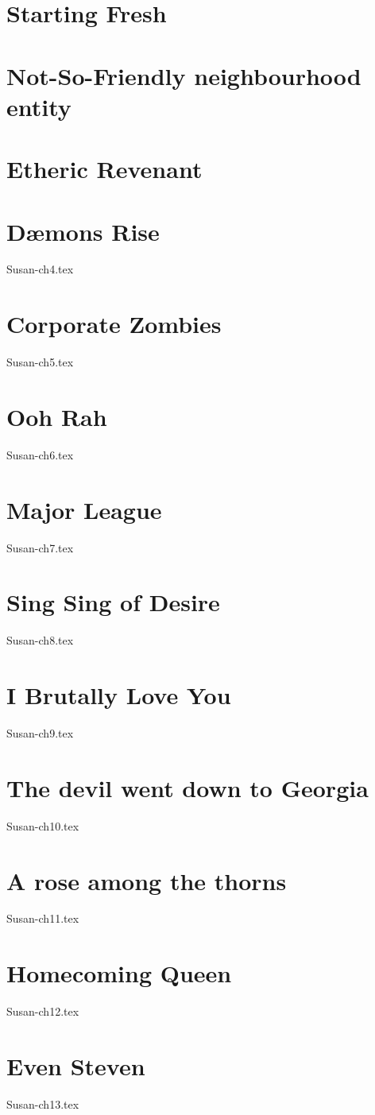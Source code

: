 \documentclass[12pt,twoside,onecolumn,openright,extrafontsizes]{memoir}
\begin{document}
	\chapter{Starting Fresh}
	
	\chapter{Not-So-Friendly neighbourhood entity}
	
	\chapter{Etheric Revenant}
	
	\chapter{D\ae mons Rise}
	 {Susan-ch4.tex}
	\chapter{Corporate Zombies}
	 {Susan-ch5.tex}
	\chapter{Ooh Rah}
	 {Susan-ch6.tex}
	\chapter{Major League}
	 {Susan-ch7.tex}
	\chapter{Sing Sing of Desire}
	 {Susan-ch8.tex}
	\chapter{I Brutally Love You}
	 {Susan-ch9.tex}
	\chapter{The devil went down to Georgia}
	 {Susan-ch10.tex}
	\chapter{A rose among the thorns}
	 {Susan-ch11.tex}
	\chapter{Homecoming Queen}
	 {Susan-ch12.tex}
	\chapter{Even Steven}
	 {Susan-ch13.tex}
\end{document}
